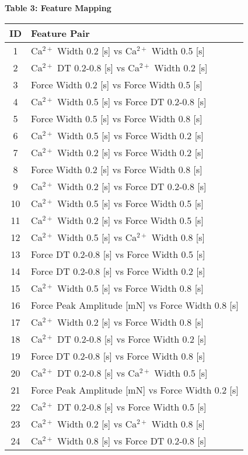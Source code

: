 \documentclass{article}
\begin{document}
\noindent\textbf{Table 3: Feature Mapping}
\begin{longtable}{|c|l|}
\hline
\textbf{ID} & \textbf{Feature Pair} \\
\hline
\endhead
1 & Ca$^{2+}$ Width 0.2 [s] vs Ca$^{2+}$ Width 0.5 [s] \\
\hline
2 & Ca$^{2+}$ DT 0.2-0.8 [s] vs Ca$^{2+}$ Width 0.2 [s] \\
\hline
3 & Force Width 0.2 [s] vs Force Width 0.5 [s] \\
\hline
4 & Ca$^{2+}$ Width 0.5 [s] vs Force DT 0.2-0.8 [s] \\
\hline
5 & Force Width 0.5 [s] vs Force Width 0.8 [s] \\
\hline
6 & Ca$^{2+}$ Width 0.5 [s] vs Force Width 0.2 [s] \\
\hline
7 & Ca$^{2+}$ Width 0.2 [s] vs Force Width 0.2 [s] \\
\hline
8 & Force Width 0.2 [s] vs Force Width 0.8 [s] \\
\hline
9 & Ca$^{2+}$ Width 0.2 [s] vs Force DT 0.2-0.8 [s] \\
\hline
10 & Ca$^{2+}$ Width 0.5 [s] vs Force Width 0.5 [s] \\
\hline
11 & Ca$^{2+}$ Width 0.2 [s] vs Force Width 0.5 [s] \\
\hline
12 & Ca$^{2+}$ Width 0.5 [s] vs Ca$^{2+}$ Width 0.8 [s] \\
\hline
13 & Force DT 0.2-0.8 [s] vs Force Width 0.5 [s] \\
\hline
14 & Force DT 0.2-0.8 [s] vs Force Width 0.2 [s] \\
\hline
15 & Ca$^{2+}$ Width 0.5 [s] vs Force Width 0.8 [s] \\
\hline
16 & Force Peak Amplitude [mN] vs Force Width 0.8 [s] \\
\hline
17 & Ca$^{2+}$ Width 0.2 [s] vs Force Width 0.8 [s] \\
\hline
18 & Ca$^{2+}$ DT 0.2-0.8 [s] vs Force Width 0.2 [s] \\
\hline
19 & Force DT 0.2-0.8 [s] vs Force Width 0.8 [s] \\
\hline
20 & Ca$^{2+}$ DT 0.2-0.8 [s] vs Ca$^{2+}$ Width 0.5 [s] \\
\hline
21 & Force Peak Amplitude [mN] vs Force Width 0.2 [s] \\
\hline
22 & Ca$^{2+}$ DT 0.2-0.8 [s] vs Force Width 0.5 [s] \\
\hline
23 & Ca$^{2+}$ Width 0.2 [s] vs Ca$^{2+}$ Width 0.8 [s] \\
\hline
24 & Ca$^{2+}$ Width 0.8 [s] vs Force DT 0.2-0.8 [s] \\

\end{longtable}
\end{document}
